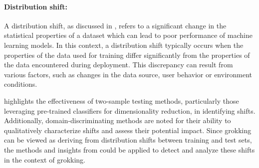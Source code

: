 

\paragraph{Distribution shift:} A distribution shift, as discussed in \citet{quinonero2022datashift}, refers to a significant change in the statistical properties of a dataset which can lead to poor performance of machine learning models. In this context, a distribution shift typically occurs when the properties of the data used for training differ significantly from the properties of the data encountered during deployment. This discrepancy can result from various factors, such as changes in the data source, user behavior or environment conditions.

\citet{Rabanser2019detect_shift} highlights the effectiveness of two-sample testing methods, particularly those leveraging pre-trained classifiers for dimensionality reduction, in identifying shifts. Additionally, domain-discriminating methods are noted for their ability to qualitatively characterize shifts and assess their potential impact. Since grokking can be viewed as deriving from distribution shifts between training and test sets, the methods and insights from \cite{Rabanser2019detect_shift} could be applied to detect and analyze these shifts in the context of grokking.